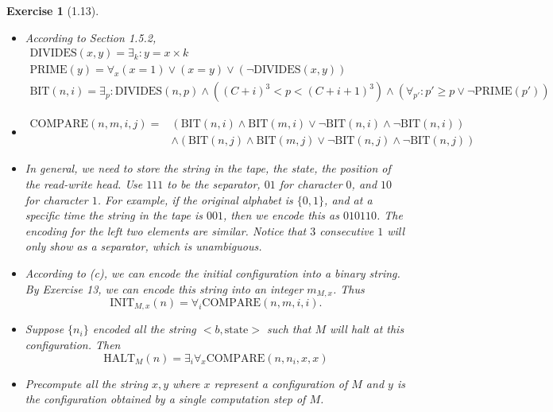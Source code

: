 \documentclass[a4paper]{article}
\newtheorem*{exercise}{Exercise}
\newcommand{\bin}{\{0,1\}}
\begin{document}
\begin{exercise}[1.13]
	\begin{itemize}
		\item[(a)] According to Section 1.5.2, 
            \begin{gather*}
                \text{DIVIDES}(x,y)=\exists_k: y=x\times k\\
                \text{PRIME}(y)=\forall_x (x=1)\vee(x=y)\vee(\neg\text{DIVIDES}(x,y))\\
                \text{BIT}(n,i)=\exists_p: \text{DIVIDES}(n,p)\wedge ((C+i)^3<p<(C+i+1)^3) 
                \wedge (\forall_{p'}: p'\geq p\vee\neg\text{PRIME}(p'))
            \end{gather*}

		\item[(b)] 
            \begin{align*}
                \text{COMPARE}(n,m,i,j)=&(\text{BIT}(n,i)\wedge\text{BIT}(m,i)\vee\neg\text{BIT}(n,i)\wedge\neg\text{BIT}(n,i))\\
                &\wedge(\text{BIT}(n,j)\wedge\text{BIT}(m,j)\vee\neg\text{BIT}(n,j)\wedge\neg\text{BIT}(n,j))
            \end{align*}
	    \item[(c)] In general, we need to store the string in the tape, the state,
            the position of the read-write head. 
            Use $111$ to be the separator, $01$ for character $0$, and $10$ for character $1$. 
            For example, if the original alphabet is $\bin$, and at a specific time the string in the tape is $001$, 
            then we encode this as $010110$. The encoding for the left two elements are similar. 
            Notice that $3$ consecutive $1$ will only show as a separator, which is unambiguous.
        \item[(d)] According to (c), we can encode the initial configuration into a binary string. 
            By Exercise 13, we can encode this string into an integer $m_{M,x}$. 
            Thus 
            $$
            \text{INIT}_{M,x}(n)=\forall_i\text{COMPARE}(n,m,i,i).
            $$
        \item[(e)] Suppose $\{n_i\}$ encoded all the string $<b,\text{state}>$ such that $M$ will halt at this configuration. 
            Then 
            $$
            \text{HALT}_M(n)=\exists_i \forall_x\text{COMPARE}(n,n_i,x,x)
            $$   
        \item[(f)] Precompute all the string $x,y$ where $x$ represent a configuration of $M$ and 
            $y$ is the configuration obtained by a single computation step of $M$. 

\end{itemize}
\end{exercise}
\end{document}
